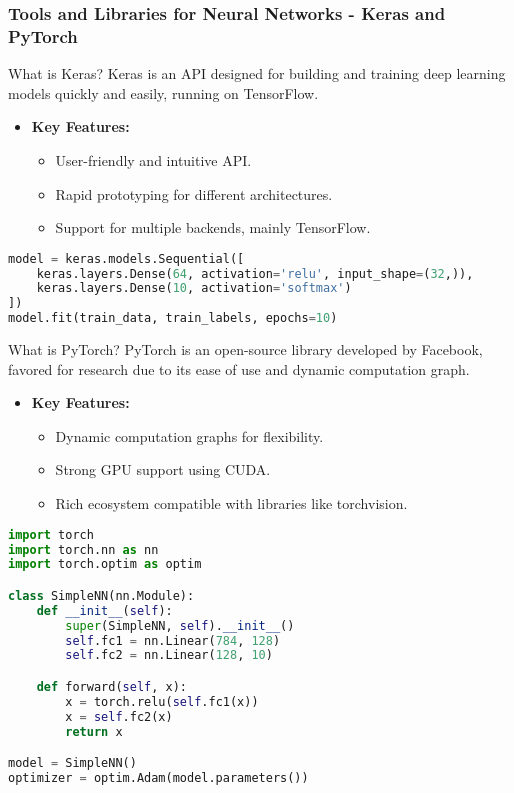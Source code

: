 \documentclass[aspectratio=169]{beamer}
\begin{document}
\begin{frame}[fragile]
    \frametitle{Tools and Libraries for Neural Networks - Keras and PyTorch}
    \begin{block}{What is Keras?}
        Keras is an API designed for building and training deep learning models quickly and easily, running on TensorFlow.
    \end{block}
    
    \begin{itemize}
        \item \textbf{Key Features:}
        \begin{itemize}
            \item User-friendly and intuitive API.
            \item Rapid prototyping for different architectures.
            \item Support for multiple backends, mainly TensorFlow.
        \end{itemize}
    \end{itemize}
    
    \begin{lstlisting}[language=Python]
model = keras.models.Sequential([
    keras.layers.Dense(64, activation='relu', input_shape=(32,)),
    keras.layers.Dense(10, activation='softmax')
])
model.fit(train_data, train_labels, epochs=10)
    \end{lstlisting}

    \begin{block}{What is PyTorch?}
        PyTorch is an open-source library developed by Facebook, favored for research due to its ease of use and dynamic computation graph.
    \end{block}
    
    \begin{itemize}
        \item \textbf{Key Features:}
        \begin{itemize}
            \item Dynamic computation graphs for flexibility.
            \item Strong GPU support using CUDA.
            \item Rich ecosystem compatible with libraries like torchvision.
        \end{itemize}
    \end{itemize}

    \begin{lstlisting}[language=Python]
import torch
import torch.nn as nn
import torch.optim as optim

class SimpleNN(nn.Module):
    def __init__(self):
        super(SimpleNN, self).__init__()
        self.fc1 = nn.Linear(784, 128)
        self.fc2 = nn.Linear(128, 10)

    def forward(self, x):
        x = torch.relu(self.fc1(x))
        x = self.fc2(x)
        return x

model = SimpleNN()
optimizer = optim.Adam(model.parameters())
    \end{lstlisting}
\end{frame}
\end{document}
